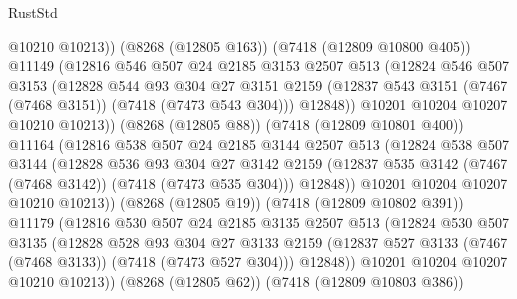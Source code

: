 \begin{lexlean}{RustStd}
\begin{coremodule}
                      @10210
                      @10213))
                  (@8268 (@12805 @163))
                  (@7418 (@12809 @10800 @405))
                  @11149
                  (@12816
                    @546
                    @507
                    @24
                    @2185
                    @3153
                    @2507
                    @513
                    (@12824
                      @546
                      @507
                      @3153
                      (@12828
                        @544
                        @93
                        @304
                        @27
                        @3151
                        @2159
                        (@12837 @543 @3151 (@7467 (@7468 @3151)) (@7418 (@7473 @543 @304)))
                        @12848))
                    @10201
                    @10204
                    @10207
                    @10210
                    @10213))
                (@8268 (@12805 @88))
                (@7418 (@12809 @10801 @400))
                @11164
                (@12816
                  @538
                  @507
                  @24
                  @2185
                  @3144
                  @2507
                  @513
                  (@12824
                    @538
                    @507
                    @3144
                    (@12828
                      @536
                      @93
                      @304
                      @27
                      @3142
                      @2159
                      (@12837 @535 @3142 (@7467 (@7468 @3142)) (@7418 (@7473 @535 @304)))
                      @12848))
                  @10201
                  @10204
                  @10207
                  @10210
                  @10213))
              (@8268 (@12805 @19))
              (@7418 (@12809 @10802 @391))
              @11179
              (@12816
                @530
                @507
                @24
                @2185
                @3135
                @2507
                @513
                (@12824
                  @530
                  @507
                  @3135
                  (@12828
                    @528
                    @93
                    @304
                    @27
                    @3133
                    @2159
                    (@12837 @527 @3133 (@7467 (@7468 @3133)) (@7418 (@7473 @527 @304)))
                    @12848))
                @10201
                @10204
                @10207
                @10210
                @10213))
            (@8268 (@12805 @62))
            (@7418 (@12809 @10803 @386))

\end{coremodule}
\end{lexlean}
